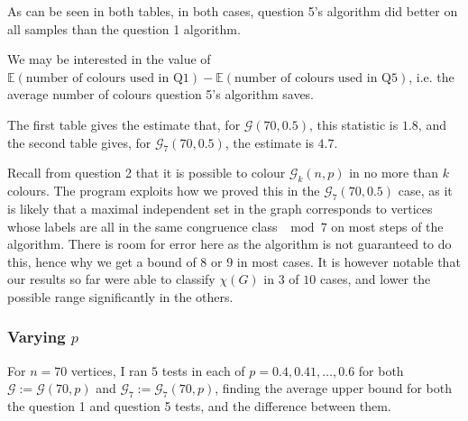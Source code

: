 \documentclass{article}
\begin{document}
 As can be seen in both tables, in both cases, question 5's algorithm did better on all samples than the question 1 algorithm.
 
 We may be interested in the value of $\mathbb{E}(\text{number of colours used in Q1}) - \mathbb{E}(\text{number of colours used in Q5})$, i.e. the average number of colours question 5's algorithm saves.
 
The first table gives the estimate that, for $\mathcal{G}(70,0.5)$, this statistic is $1.8$, and the second table gives, for $\mathcal{G}_7(70,0.5)$, the estimate is $4.7$.

Recall from question 2 that it is possible to colour $\mathcal{G}_k(n,p)$ in no more than $k$ colours. The program exploits how we proved this in the $\mathcal{G}_7(70,0.5)$ case, as it is likely that a maximal independent set in the graph corresponds to vertices whose labels are all in the same congruence class $\mod 7$ on most steps of the algorithm. There is room for error here as the algorithm is not guaranteed to do this, hence why we get a bound of $8$ or $9$ in most cases. It is however notable that our results so far were able to classify $\chi(G)$ in $3$ of $10$ cases, and lower the possible range significantly in the others.

\subsubsection{Varying $p$}

For $n=70$ vertices, I ran $5$ tests in each of $p=0.4,0.41,\dots, 0.6$ for both $\mathcal{G} := \mathcal{G}(70,p)$ and $\mathcal{G}_7 := \mathcal{G}_7(70,p)$, finding the average upper bound for both the question 1 and question 5 tests, and the difference between them.

\begin{center}
\end{center}
\end{document}
